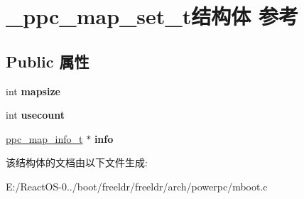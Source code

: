 \hypertarget{struct__ppc__map__set__t}{}\section{\+\_\+ppc\+\_\+map\+\_\+set\+\_\+t结构体 参考}
\label{struct__ppc__map__set__t}
\subsection*{Public 属性}
\begin{DoxyCompactItemize}
\item 
\mbox{\label{struct__ppc__map__set__t_ae5458527da466defa3e039783a8bf7ca}} 
int {\bfseries mapsize}
\item 
\mbox{\label{struct__ppc__map__set__t_ae523dddae73bbe4fac5de33cf428e8ba}} 
int {\bfseries usecount}
\item 
\mbox{\label{struct__ppc__map__set__t_a1342137b4b5126adfe2dc5120afaa533}} 
\hyperlink{struct__ppc__map__info__t}{ppc\+\_\+map\+\_\+info\+\_\+t} $\ast$ {\bfseries info}
\end{DoxyCompactItemize}


该结构体的文档由以下文件生成\+:\begin{DoxyCompactItemize}
\item 
E\+:/\+React\+O\+S-\/0../boot/freeldr/freeldr/arch/powerpc/mboot.\+c\end{DoxyCompactItemize}

